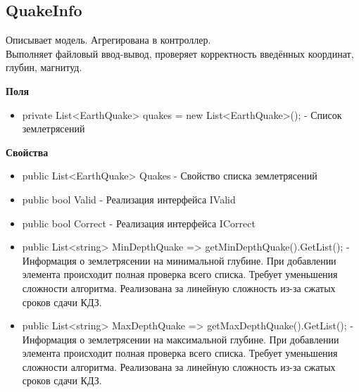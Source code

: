 \documentclass[a4paper,12pt, fleqn]{article}
\theoremstyle{plain} %
\theoremstyle{definition} %
\theoremstyle{remark} %
\numberwithin{equation}{section}
\begin{document}
\subsection{QuakeInfo}
Описывает модель. Агрегирована в контроллер.\\
Выполняет файловый ввод-вывод\cite{StreamReader}\cite{FileDialog}, проверяет корректность введённых координат\cite{Coord},\\ глубин\cite{EartQ}, магнитуд\cite{Mag}.

\textbf{Поля}
\begin{itemize}
	\item private List<EarthQuake> quakes = new List<EarthQuake>(); - Список землетрясений
\end{itemize}

\textbf{Свойства}
\begin{itemize}
	\item public List<EarthQuake> Quakes - Свойство списка землетрясений
	\item public bool Valid - Реализация интерфейса IValid
	\item public bool Correct - Реализация интерфейса ICorrect
	\item public List<string> MinDepthQuake => getMinDepthQuake().GetList(); - Информация о землетрясении на минимальной глубине. При добавлении элемента происходит полная проверка всего списка. Требует уменьшения сложности алгоритма. Реализована за линейную сложность из-за сжатых сроков сдачи КДЗ.
	\item public List<string> MaxDepthQuake => getMaxDepthQuake().GetList(); - Информация о землетрясении на максимальной глубине. При добавлении элемента происходит полная проверка всего списка. Требует уменьшения сложности алгоритма. Реализована за линейную сложность из-за сжатых сроков сдачи КДЗ.
\end{itemize}
\end{document}
